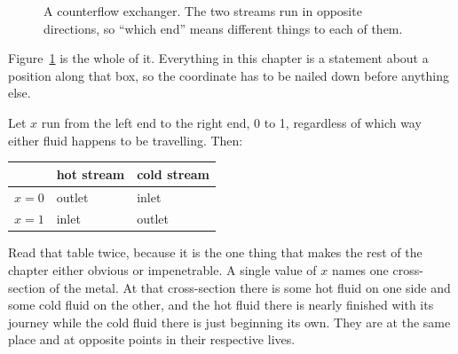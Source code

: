 \documentclass[11pt,a4paper]{report}
\begin{document}
\begin{figure}[htbp]
\centering
{}
\caption{A counterflow exchanger. The two streams run in opposite
directions, so ``which end'' means different things to each of them.}
\label{fig:cf}
\end{figure}

Figure~\ref{fig:cf} is the whole of it. Everything in this chapter is a
statement about a position along that box, so the coordinate has to be
nailed down before anything else.

Let $x$ run from the left end to the right end, \SI{0}{} to \SI{1}{},
regardless of which way either fluid happens to be travelling. Then:

\begin{center}
\begin{tabular}{@{}lll@{}}
\toprule
       & hot stream & cold stream \\
\midrule
$x=0$  & outlet     & inlet  \\
$x=1$  & inlet      & outlet \\
\bottomrule
\end{tabular}
\end{center}

Read that table twice, because it is the one thing that makes the rest of
the chapter either obvious or impenetrable. A single value of $x$ names one
cross-section of the metal. At that cross-section there is some hot fluid on
one side and some cold fluid on the other, and the hot fluid there is nearly
finished with its journey while the cold fluid there is just beginning its
own. They are at the same place and at opposite points in their respective
lives.
\end{document}
